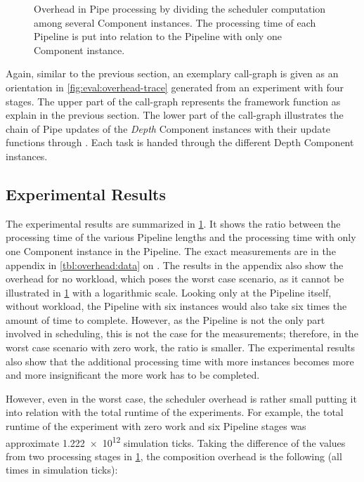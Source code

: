 \begin{figure}[!t] \centering
	\caption[Overhead in Pipe processing by dividing the scheduler computation among several Component instances.]{Overhead in Pipe processing by dividing the scheduler computation among several Component instances. The processing time of each Pipeline is put into relation to the Pipeline with only one Component instance.}%
	\label{fig:eval:pipe-overhead}
\end{figure}

Again, similar to the previous section, an exemplary call-graph is given as an orientation in \cref{fig:eval:overhead-trace} generated from an experiment with four stages. The upper part of the call-graph represents the framework function as explain in the previous section. The lower part of the call-graph illustrates the chain of Pipe updates of the \emph{Depth} Component instances with their update functions  through . Each task is handed through the different Depth Component instances.

\subsection{Experimental Results}%
\label{sec:studies:overhead:results}

The experimental results are summarized in \cref{fig:eval:pipe-overhead}. It shows the ratio between the processing time of the various Pipeline lengths and the processing time with only one Component instance in the Pipeline. The exact measurements are in the appendix in \cref{tbl:overhead:data} on . The results in the appendix also show the overhead for no workload, which poses the worst case scenario, as it cannot be illustrated in \cref{fig:eval:pipe-overhead} with a logarithmic scale. Looking only at the Pipeline itself, without workload, the Pipeline with six instances would also take six times the amount of time to complete. However, as the Pipeline is not the only part involved in scheduling, this is not the case for the measurements; therefore, in the worst case scenario with zero work, the ratio is smaller. The experimental results also show that the additional processing time with more instances becomes more and more insignificant the more work has to be completed.

However, even in the worst case, the scheduler overhead is rather small putting it into relation with the total runtime of the experiments. For example, the total runtime of the experiment with zero work and six Pipeline stages was approximate \num{1.222e12} simulation ticks. Taking the difference of the values from two processing stages in \cref{fig:eval:pipe-overhead}, the composition overhead is the following (all times in simulation ticks):

